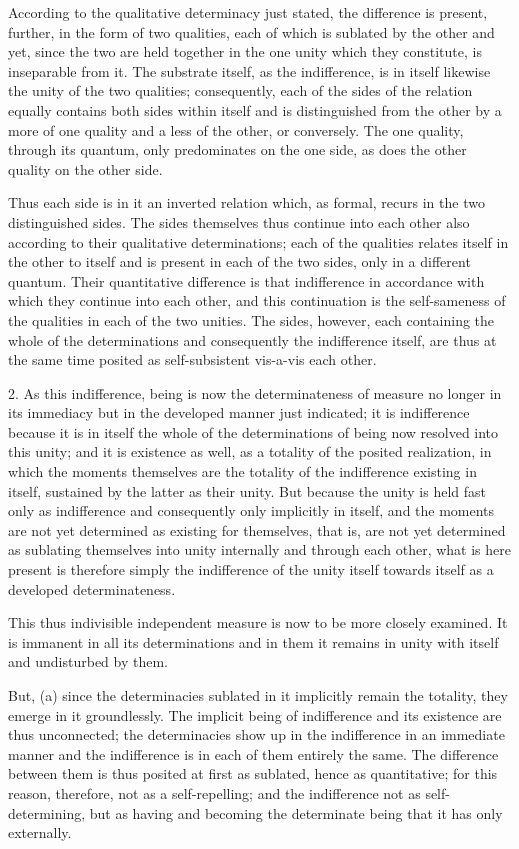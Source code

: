 According to the qualitative determinacy just stated,
the difference is present, further, in the form of two qualities,
each of which is sublated by the other
and yet, since the two are held together in the one unity
which they constitute, is inseparable from it.
The substrate itself, as the indifference,
is in itself likewise the unity of the two qualities;
consequently, each of the sides of the relation
equally contains both sides within itself
and is distinguished from the other
by a more of one quality
and a less of the other, or conversely.
The one quality, through its quantum,
only predominates on the one side,
as does the other quality on the other side.

Thus each side is in it an inverted relation
which, as formal, recurs in the two distinguished sides.
The sides themselves thus continue into each other
also according to their qualitative determinations;
each of the qualities relates itself in the other to itself
and is present in each of the two sides,
only in a different quantum.
Their quantitative difference is that indifference
in accordance with which they continue into each other,
and this continuation is the self-sameness of the qualities
in each of the two unities.
The sides, however, each containing
the whole of the determinations
and consequently the indifference itself,
are thus at the same time posited as
self-subsistent vis-a-vis each other.

2. As this indifference,
being is now the determinateness of measure
no longer in its immediacy
but in the developed manner just indicated;
it is indifference because it is in itself
the whole of the determinations of being
now resolved into this unity;
and it is existence as well,
as a totality of the posited realization,
in which the moments themselves are the totality of
the indifference existing in itself,
sustained by the latter as their unity.
But because the unity is held fast only as indifference
and consequently only implicitly in itself,
and the moments are not yet determined
as existing for themselves,
that is, are not yet determined as
sublating themselves into unity internally
and through each other,
what is here present is therefore simply
the indifference of the unity itself
towards itself as a developed determinateness.

This thus indivisible independent measure is
now to be more closely examined.
It is immanent in all its determinations
and in them it remains in unity with itself
and undisturbed by them.

But, (a) since the determinacies
sublated in it implicitly remain the totality,
they emerge in it groundlessly.
The implicit being of indifference
and its existence are thus unconnected;
the determinacies show up in the indifference in an immediate manner
and the indifference is in each of them entirely the same.
The difference between them is
thus posited at first as sublated, hence as quantitative;
for this reason, therefore, not as a self-repelling;
and the indifference not as self-determining,
but as having and becoming the determinate being
that it has only externally.

